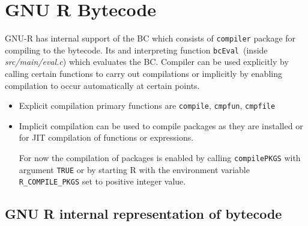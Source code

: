 \documentclass[thesis=M,english]{FITthesis}[2018/10/20]
\newcommand{\code}[1]{\texttt{#1}}
\begin{document}
\begin{lstlisting}

\end{lstlisting}


\section{GNU R Bytecode}

GNU-R has internal support of the BC which consists of \code{compiler} package for compiling to the bytecode. Its and interpreting function \code{bcEval}~(inside \textit{src/main/eval.c}) which evaluates the BC. Compiler can be used explicitly by calling certain functions to carry out compilations or implicitly by enabling compilation to occur automatically at certain points.

\begin{itemize}
  \item Explicit compilation primary functions are \code{compile}, \code{cmpfun}, \code{cmpfile}
  \item Implicit compilation can be used to compile packages as they are installed or for JIT compilation of functions or expressions.

For now the compilation of packages is enabled by calling \code{compilePKGS} with argument \code{TRUE} or by starting R with the environment variable \code{R{\_}COMPILE{\_}PKGS} set to positive integer value.
\end{itemize}


\subsection{GNU R internal representation of bytecode}\label{R-internal-bc-representation}
\end{document}
